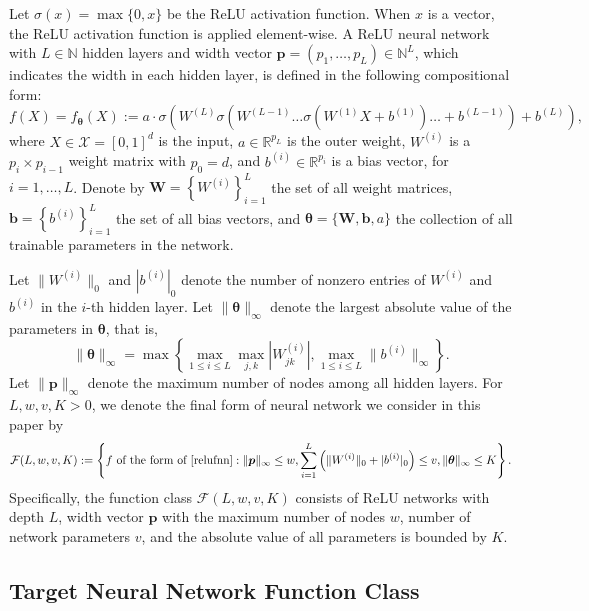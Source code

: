 \documentclass{article}
\def\NN{\mathbb N}
\def\RR{\mathbb R}
\begin{document}
Let $\sigma(x) = \max\{0,x\}$ be the ReLU activation function. When $x$ is a vector, the ReLU activation function is applied element-wise. 
A ReLU neural network with $L\in \NN$ hidden layers and width vector $\bm {p} = (p_1, \ldots, p_L) \in \NN^L$, which indicates the width in each hidden layer, is defined in the following
compositional form:
\begin{equation} \label{relufnn}
     f(X) = f_{\bm \theta}(X) :=a \cdot \sigma \left(W^{(L)}\sigma \left(W^{(L-1)}\ldots \sigma \left(W^{(1)} X + b^{(1)}\right)\ldots + b^{(L-1)}\right)+ b^{(L)}\right),
\end{equation}
where $X\in \mathcal{X} = [0,1]^d$ is the input,  $a\in \RR^{p_L}$ is the outer weight, $W^{(i)}$ is a $p_i \times p_{i-1}$ weight matrix with $p_0=d$, and $b^{(i)} \in \RR^{p_i}$ is a bias vector, for $i=1,\ldots,L$. Denote by $\bm{W} = \left\{W^{(i)}\right\}_{i=1}^L$ the set of all weight matrices, $\bm{b} = \left\{b^{(i)}\right\}_{i=1}^L$ the set of all bias vectors, and $\bm \theta = \{\bm{W}, \bm{b},a\}$ the collection of all trainable parameters in the network. 

Let $\|W^{(i)}\|_0$ and $|b^{(i)}|_0$ denote the number of nonzero entries of $W^{(i)}$ and $b^{(i)}$ in the $i$-th hidden layer. 
Let $\|\bm \theta\|_\infty$ denote the largest absolute value of the parameters in $\bm \theta$, that is, 
$$\|\bm \theta\|_\infty = \max \left\{\max_{1\leq i \leq L} \max_{j,k}\left|W^{(i)}_{jk}\right|, \max_{1\leq i \leq L} \|b^{(i)}\|_\infty\right\}. $$
Let $\|\bm {p}\|_\infty$ denote the maximum number of nodes among all hidden layers. 
For $L,w,v,K>0$, we denote the final form of neural network we consider in this paper by
\begin{equation}
\label{eqn:hypothesis_class}
    \mathcal{F}(L, w, v, K) := \left\{f \text{ of the form of } \eqref{relufnn}:  \|\bm {p}\|_\infty \leq w, \sum_{i=1}^L \left(\|W^{(i)}\|_0 + |b^{(i)}|_0\right) \leq v, \|\bm \theta\|_\infty \leq K\right\}. 
\end{equation}
Specifically, the function class $\mathcal{F}(L , w, v, K)$ consists of ReLU networks with depth $L$, width vector $\bm {p}$ with the maximum number of nodes $w$, number of network parameters $v$, and the absolute value of all parameters is bounded by $K$. 


\subsection{Target Neural Network Function Class}
\end{document}
